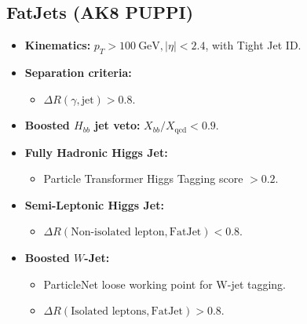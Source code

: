 \subsection*{FatJets (AK8 PUPPI)}
\begin{itemize}
    \item \textbf{Kinematics:} \(p_T > 100~\text{GeV}, |\eta| < 2.4\), with Tight Jet ID.
    \item \textbf{Separation criteria:}
    \begin{itemize}
        \item \(\Delta R(\gamma, \text{jet}) > 0.8\).
    \end{itemize}
    \item \textbf{Boosted \(H_{bb}\) jet veto:} \(X_{bb}/X_{\text{qcd}} < 0.9\).
    \item \textbf{Fully Hadronic Higgs Jet:}
    \begin{itemize}
        \item Particle Transformer Higgs Tagging score \(> 0.2\).
    \end{itemize}
    \item \textbf{Semi-Leptonic Higgs Jet:}
    \begin{itemize}
        \item \(\Delta R(\text{Non-isolated lepton}, \text{FatJet}) < 0.8\).
    \end{itemize}
    \item \textbf{Boosted \(W\)-Jet:}
    \begin{itemize}
        \item ParticleNet loose working point for W-jet tagging.
        \item \(\Delta R(\text{Isolated leptons}, \text{FatJet}) > 0.8\).
    \end{itemize}
\end{itemize}

